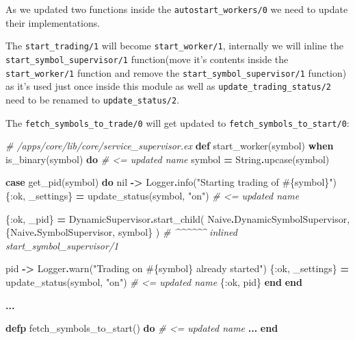 \documentclass[
]{book}
\newenvironment{Shaded}{\begin{snugshade}}{\end{snugshade}}
\newcommand{\CommentTok}[1]{\textcolor[rgb]{0.56,0.35,0.01}{\textit{#1}}}
\newcommand{\ConstantTok}[1]{\textcolor[rgb]{0.00,0.00,0.00}{#1}}
\newcommand{\KeywordTok}[1]{\textcolor[rgb]{0.13,0.29,0.53}{\textbf{#1}}}
\newcommand{\NormalTok}[1]{#1}
\newcommand{\OperatorTok}[1]{\textcolor[rgb]{0.81,0.36,0.00}{\textbf{#1}}}
\newcommand{\OtherTok}[1]{\textcolor[rgb]{0.56,0.35,0.01}{#1}}
\newcommand{\StringTok}[1]{\textcolor[rgb]{0.31,0.60,0.02}{#1}}
\newcommand{\VariableTok}[1]{\textcolor[rgb]{0.00,0.00,0.00}{#1}}
\begin{document}
As we updated two functions inside the \texttt{autostart\_workers/0} we need to update their implementations.

The \texttt{start\_trading/1} will become \texttt{start\_worker/1}, internally we will inline the \texttt{start\_symbol\_supervisor/1} function(move it's contents inside the \texttt{start\_worker/1} function and remove the \texttt{start\_symbol\_supervisor/1} function) as it's used just once inside this module as well as \texttt{update\_trading\_status/2} need to be renamed to \texttt{update\_status/2}.

The \texttt{fetch\_symbols\_to\_trade/0} will get updated to \texttt{fetch\_symbols\_to\_start/0}:

\begin{Shaded}
\begin{Highlighting}[]
  \CommentTok{\# /apps/core/lib/core/service\_supervisor.ex}
  \KeywordTok{def}\NormalTok{ start\_worker(symbol) }\KeywordTok{when}\NormalTok{ is\_binary(symbol) }\KeywordTok{do} \CommentTok{\# \textless{}= updated name}
\NormalTok{    symbol }\OperatorTok{=} \ConstantTok{String}\OperatorTok{.}\NormalTok{upcase(symbol)}

    \KeywordTok{case}\NormalTok{ get\_pid(symbol) }\KeywordTok{do}
      \ConstantTok{nil} \OperatorTok{{-}\textgreater{}}
        \ConstantTok{Logger}\OperatorTok{.}\NormalTok{info(}\StringTok{"Starting trading of }\OtherTok{\#\{}\NormalTok{symbol}\OtherTok{\}}\StringTok{"}\NormalTok{)}
\NormalTok{        \{}\VariableTok{:ok}\NormalTok{, \_settings\} }\OperatorTok{=}\NormalTok{ update\_status(symbol, }\StringTok{"on"}\NormalTok{) }\CommentTok{\# \textless{}= updated name}

\NormalTok{        \{}\VariableTok{:ok}\NormalTok{, \_pid\} }\OperatorTok{=}
          \ConstantTok{DynamicSupervisor}\OperatorTok{.}\NormalTok{start\_child(}
            \ConstantTok{Naive}\OperatorTok{.}\ConstantTok{DynamicSymbolSupervisor}\NormalTok{,}
\NormalTok{            \{}\ConstantTok{Naive}\OperatorTok{.}\ConstantTok{SymbolSupervisor}\NormalTok{, symbol\}}
\NormalTok{          )  }\CommentTok{\# \^{}\^{}\^{}\^{}\^{}\^{} inlined \textasciigrave{}start\_symbol\_supervisor/1\textasciigrave{}}

\NormalTok{      pid }\OperatorTok{{-}\textgreater{}}
        \ConstantTok{Logger}\OperatorTok{.}\NormalTok{warn(}\StringTok{"Trading on }\OtherTok{\#\{}\NormalTok{symbol}\OtherTok{\}}\StringTok{ already started"}\NormalTok{)}
\NormalTok{        \{}\VariableTok{:ok}\NormalTok{, \_settings\} }\OperatorTok{=}\NormalTok{ update\_status(symbol, }\StringTok{"on"}\NormalTok{) }\CommentTok{\# \textless{}= updated name}
\NormalTok{        \{}\VariableTok{:ok}\NormalTok{, pid\}}
    \KeywordTok{end}
  \KeywordTok{end}

  \OperatorTok{...}

  \KeywordTok{defp}\NormalTok{ fetch\_symbols\_to\_start() }\KeywordTok{do} \CommentTok{\# \textless{}= updated name}
    \OperatorTok{...}
  \KeywordTok{end}  
\end{Highlighting}
\end{Shaded}
\end{document}
